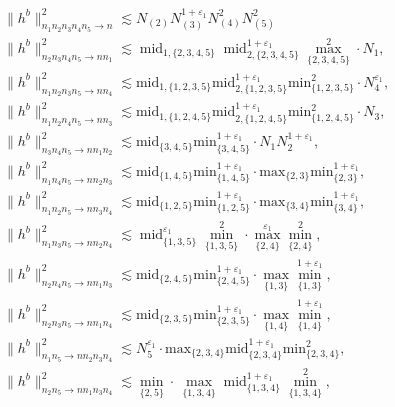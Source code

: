 \documentclass[11pt, xcolor = dvipsnames,reqno
]{amsart}
\theoremstyle{definition}
\theoremstyle{remark}
\begin{document}
    \begin{align*}
    &\lVert  h^b \rVert_{n_1n_2n_3n_4n_5 \to n}^2 \lesssim N_{(2)} N_{(3)}^{1 + \varepsilon_1} N_{(4)}^2 N_{(5)}^2  \\
    &\lVert  h^b \rVert_{n_2n_3n_4n_5 \to nn_1}^2 \lesssim  \operatorname{mid}_{1,\{2,3,4,5\}} \operatorname{mid}_{2,\{2,3,4,5\}}^{1+\varepsilon_1}  \operatorname{max}_{\{2,3,4,5\}}^2 \cdot  N_1, \\
    &\lVert  h^b \rVert_{n_1n_2n_3n_5 \to nn_4}^2 \lesssim \text{mid}_{1,\{1,2,3,5\}} \text{mid}_{2,\{1,2,3,5\}}^{1+\varepsilon_1} \text{min}_{\{1,2,3,5\}}^2  \cdot N_4^{\varepsilon_1}, \\
    &\lVert  h^b \rVert_{n_1n_2n_4n_5 \to nn_3}^2 \lesssim \text{mid}_{1,\{1,2,4,5\}} \text{mid}_{2,\{1,2,4,5\}}^{1 + \varepsilon_1} \text{min}_{\{1,2,4,5\}}^2  \cdot N_3, \\
    & \lVert  h^b \rVert_{n_3n_4n_5 \to nn_1n_2}^2 \lesssim  \text{mid}_{\{3,4,5\}} \text{min}_{\{3,4,5\}}^{1+\varepsilon_1} \cdot N_1 N_2^{1 + \varepsilon_1}, \\
    & \lVert  h^b \rVert_{n_1n_4n_5 \to nn_2n_3}^2 \lesssim  \text{mid}_{\{1,4,5\}} \text{min}_{\{1,4,5\}}^{1 + \varepsilon_1} \cdot \text{max}_{\{2,3\}} \text{min}_{\{2,3\}}^{1 + \varepsilon_1}, \\
    & \lVert  h^b \rVert_{n_1n_2n_5 \to nn_3n_4}^2 \lesssim  \text{mid}_{\{1,2,5\}} \text{min}_{\{1,2,5\}}^{1 + \varepsilon_1} \cdot  \text{max}_{\{3,4\}} \text{min}_{\{3,4\}}^{1 + \varepsilon_1}, \\
    & \lVert  h^b \rVert_{n_1n_3n_5 \to nn_2n_4}^2 \lesssim  \operatorname{mid}_{\{1,3,5\}}^{\varepsilon_1} \operatorname{min}_{\{1,3,5\}}^2 \cdot  \operatorname{max}_{\{2,4\}}^{\varepsilon_1} \operatorname{min}_{\{2,4\}}^2,  \\
    & \lVert  h^b \rVert_{n_2n_4n_5 \to nn_1n_3}^2 \lesssim  \text{mid}_{\{2,4,5\}} \text{min}_{\{2,4,5\}}^{1 + \varepsilon_1}  \cdot \operatorname{max}_{\{1,3\}} \operatorname{min}_{\{1,3\}}^{1 + \varepsilon_1}, \\
    & \lVert  h^b \rVert_{n_2n_3n_5 \to nn_1n_4}^2 \lesssim  \text{mid}_{\{2,3,5\}} \text{min}_{\{2,3,5\}}^{1 + \varepsilon_1} \cdot \operatorname{max}_{\{1,4\}} \operatorname{min}_{\{1,4\}}^{1 + \varepsilon_1}, \\
    & \lVert  h^b \rVert_{n_1n_5 \to nn_2n_3n_4}^2 \lesssim N_5^{\varepsilon_1} \cdot \text{max}_{\{2,3,4\}}  \text{mid}_{\{2,3,4\}}^{1 + \varepsilon_1} \text{min}_{\{2,3,4\}}^2, \\
    & \lVert  h^b \rVert_{n_2n_5 \to nn_1n_3n_4}^2 \lesssim \operatorname{min}_{\{2,5\}} \cdot \, \operatorname{max}_{\{1,3,4\}} \operatorname{mid}_{\{1,3,4\}}^{1 + \varepsilon_1} \operatorname{min}_{\{1,3,4\}}^2, \\

\end{align*}
\end{document}
